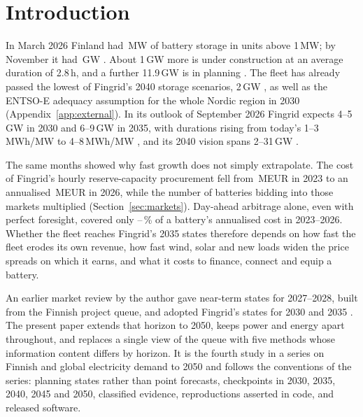 \documentclass[11pt]{article}
\newcommand{\EUR}{EUR}
\begin{document}
\section{Introduction}\label{sec:intro}

In March 2026 Finland had \,MW of battery storage in units above 1\,MW; by November it had \,GW \citep{fingrid424}.
About 1\,GW more is under construction at an average duration of 2.8\,h, and a further 11.9\,GW is in planning \citep{renewablesfi2026bess}.
The fleet has already passed the lowest of Fingrid's 2040 storage scenarios, 2\,GW \citep{fingrid2025vision2040}, as well as the ENTSO-E adequacy assumption for the whole Nordic region in 2030 (Appendix~\ref{app:external}).
In its outlook of September 2026 Fingrid expects 4--5\,GW in 2030 and 6--9\,GW in 2035, with durations rising from today's 1--3\,MWh/MW to 4--8\,MWh/MW \citep{fingrid2026prospects}, and its 2040 vision spans 2--31\,GW \citep{fingrid2025vision2040}.

The same months showed why fast growth does not simply extrapolate.
The cost of Fingrid's hourly reserve-capacity procurement fell from \,M\EUR{} in 2023 to an annualised \,M\EUR{} in 2026, while the number of batteries bidding into those markets multiplied (Section~\ref{sec:markets}).
Day-ahead arbitrage alone, even with perfect foresight, covered only --\,\% of a battery's annualised cost in 2023--2026.
Whether the fleet reaches Fingrid's 2035 states therefore depends on how fast the fleet erodes its own revenue, how fast wind, solar and new loads widen the price spreads on which it earns, and what it costs to finance, connect and equip a battery.

An earlier market review by the author gave near-term states for 2027--2028, built from the Finnish project queue, and adopted Fingrid's states for 2030 and 2035 \citep{merilehto2026blog}.
The present paper extends that horizon to 2050, keeps power and energy apart throughout, and replaces a single view of the queue with five methods whose information content differs by horizon.
It is the fourth study in a series on Finnish and global electricity demand to 2050 \citep{merilehto2026road,merilehto2026quantum,merilehto2026humanoid} and follows the conventions of the series: planning states rather than point forecasts, checkpoints in 2030, 2035, 2040, 2045 and 2050, classified evidence, reproductions asserted in code, and released software.
\end{document}
